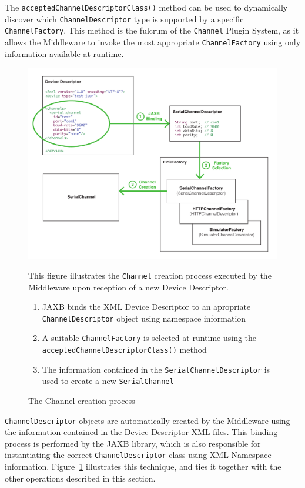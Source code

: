 The \texttt{acceptedChannelDescriptorClass()} method can be used to dynamically
discover which \texttt{ChannelDescriptor} type is supported by a specific
\texttt{ChannelFactory}. This method is the fulcrum of the \texttt{Channel}
Plugin System, as it allows the Middleware to invoke the most appropriate
\texttt{ChannelFactory} using only information available at runtime.

\begin{figure}[!hbt]
\includegraphics[width=\textwidth]{imgs/channel_creation_process.pdf}
\caption{The Channel creation process}
\label{fig:channel.creation}
{
\begin{figurenote}
This figure illustrates the \texttt{Channel} creation process executed by the
Middleware upon reception of a new Device Descriptor.
\begin{enumerate}
  \itemsep0em
  \item JAXB binds the XML Device Descriptor to an apropriate
\texttt{ChannelDescriptor} object using namespace information \item A suitable
\texttt{ChannelFactory} is selected at runtime using the
\texttt{acceptedChannelDescriptorClass()} method
  \item The information contained in the \texttt{SerialChannelDescriptor} is
used to create a new \texttt{SerialChannel}
\end{enumerate}
\end{figurenote}
}
\end{figure}

\texttt{ChannelDescriptor} objects are automatically created by the
Middleware using the information contained in the Device Descriptor XML files.
This binding process is performed by the JAXB library, which is also
responsible for instantiating the correct \texttt{ChannelDescriptor} class
using XML Namespace information. Figure~\ref{fig:channel.creation} illustrates
this technique, and ties it together with the other operations described in
this section.

